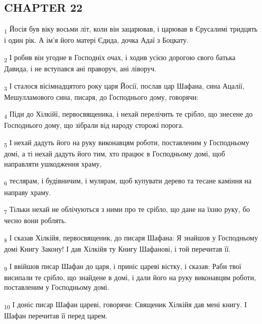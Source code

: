 \subsection{CHAPTER 22}
\begin{tcolorbox}
\textsubscript{1} Йосія був віку восьми літ, коли він зацарював, і царював в Єрусалимі тридцять і один рік. А ім'я його матері Єдида, дочка Адаї з Боцкату.
\end{tcolorbox}
\begin{tcolorbox}
\textsubscript{2} І робив він угодне в Господніх очах, і ходив усією дорогою свого батька Давида, і не вступався ані праворуч, ані ліворуч.
\end{tcolorbox}
\begin{tcolorbox}
\textsubscript{3} І сталося вісімнадцятого року царя Йосії, послав цар Шафана, сина Ацалії, Мешулламового сина, писаря, до Господнього дому, говорячи:
\end{tcolorbox}
\begin{tcolorbox}
\textsubscript{4} Піди до Хілкійї, первосвященика, і нехай перелічить те срібло, що знесене до Господнього дому, що зібрали від народу сторожі порога.
\end{tcolorbox}
\begin{tcolorbox}
\textsubscript{5} І нехай дадуть його на руку виконавцям роботи, поставленим у Господньому домі, а ті нехай дадуть його тим, хто працює в Господньому домі, щоб направляти ушкодження храму,
\end{tcolorbox}
\begin{tcolorbox}
\textsubscript{6} теслярам, і будівничим, і мулярам, щоб купувати дерево та тесане каміння на направу храму.
\end{tcolorbox}
\begin{tcolorbox}
\textsubscript{7} Тільки нехай не облічуються з ними про те срібло, що дане на їхню руку, бо чесно вони роблять.
\end{tcolorbox}
\begin{tcolorbox}
\textsubscript{8} І сказав Хілкійя, первосвященик, до писаря Шафана: Я знайшов у Господньому домі Книгу Закону! І дав Хілкійя ту Книгу Шафанові, і той перечитав її.
\end{tcolorbox}
\begin{tcolorbox}
\textsubscript{9} І ввійшов писар Шафан до царя, і приніс цареві вістку, і сказав: Раби твої висипали те срібло, що знайдене в домі, і дали його на руку виконавцям роботи, поставленим у Господньому домі.
\end{tcolorbox}
\begin{tcolorbox}
\textsubscript{10} І доніс писар Шафан цареві, говорячи: Священик Хілкійя дав мені книгу. І Шафан перечитав її перед царем.
\end{tcolorbox}
